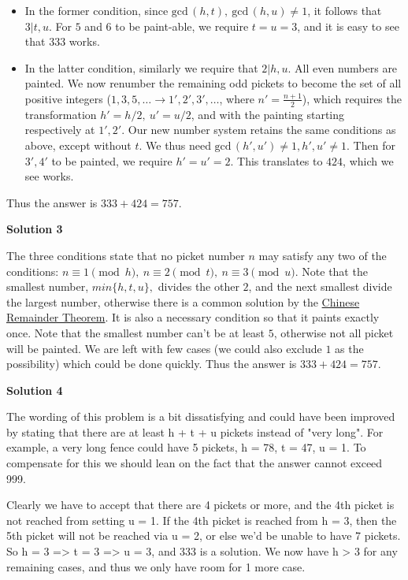 \begin{enumerate}
 
            \begin{itemize}
        \item In the former condition, since $\text{gcd}\,(h,t),\ \text{gcd}\,(h,u) \neq 1$, it follows that $3|t,u$. For $5$ and $6$ to be paint-able, we require $t = u = 3$, and it is easy to see that $333$ works.
        \item In the latter condition, similarly we require that $2|h,u$. All even numbers are painted. We now renumber the remaining odd pickets to become the set of all positive integers ($1,3,5, \ldots \rightarrow 1',2',3', \ldots$, where $n' = \frac{n+1}{2}$), which requires the transformation $h' = h/2,\ u' = u/2$, and with the painting starting respectively at $1',2'$. Our new number system retains the same conditions as above, except without $t$. We thus need $\text{gcd}\, (h',u') \neq 1, h',u' \neq 1$. Then for $3',4'$ to be painted, we require $h' = u' = 2$. This translates to $424$, which we see works.
            \end{itemize}
            Thus the answer is $333+424 = \boxed{757}$.

 



\textbf{Solution 3}

The three conditions state that no picket number $n$ may satisfy any two of the conditions: $n \equiv 1 \pmod{h},\ n \equiv 2 \pmod{t},\ n \equiv 3 \pmod{u}$. Note that the smallest number, $min \{ h,t,u \},$ divides the other $2$, and the next smallest divide the largest number, otherwise there is a common solution by the \href{https://artofproblemsolving.com/wiki/index.php?title=Chinese\_Remainder\_Theorem}{Chinese Remainder Theorem}. It is also a necessary condition so that it paints exactly once. Note that the smallest number can't be at least $5$, otherwise not all picket will be painted. We are left with few cases (we could also exclude $1$ as the possibility) which could be done quickly. Thus the answer is $333+424 = \boxed{757}$.

 



\textbf{Solution 4}

The wording of this problem is a bit dissatisfying and could have been improved by stating that there are at least h + t + u pickets instead of "very long". For example, a very long fence could have 5 pickets, h = 78, t = 47, u = 1. To compensate for this we should lean on the fact that the answer cannot exceed 999.

 Clearly we have to accept that there are 4 pickets or more, and the 4th picket is not reached from setting u = 1. If the 4th picket is reached from h = 3, then the 5th picket will not be reached via u = 2, or else we'd be unable to have 7 pickets. So h = 3 => t = 3 => u = 3, and 333 is a solution. We now have h > 3 for any remaining cases, and thus we only have room for 1 more case.


\end{enumerate}
